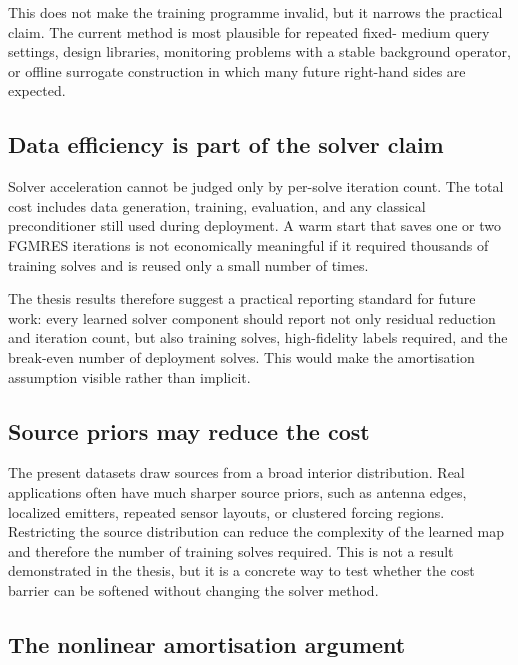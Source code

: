 This does not make the training programme invalid, but it narrows the
practical claim. The current method is most plausible for repeated fixed-
medium query settings, design libraries, monitoring problems with a stable
background operator, or offline surrogate construction in which many future
right-hand sides are expected.

\subsection{Data efficiency is part of the solver claim}
\label{subsec:discussion-data-efficiency}

Solver acceleration cannot be judged only by per-solve iteration count. The
total cost includes data generation, training, evaluation, and any classical
preconditioner still used during deployment. A warm start that saves one or
two FGMRES iterations is not economically meaningful if it required thousands
of training solves and is reused only a small number of times.

The thesis results therefore suggest a practical reporting standard for future
work: every learned solver component should report not only residual reduction
and iteration count, but also training solves, high-fidelity labels required,
and the break-even number of deployment solves. This would make the
amortisation assumption visible rather than implicit.

\subsection{Source priors may reduce the cost}
\label{subsec:discussion-source-priors}

The present datasets draw sources from a broad interior distribution. Real
applications often have much sharper source priors, such as antenna edges,
localized emitters, repeated sensor layouts, or clustered forcing regions.
Restricting the source distribution can reduce the complexity of the learned
map and therefore the number of training solves required. This is not a result
demonstrated in the thesis, but it is a concrete way to test whether the cost
barrier can be softened without changing the solver method.

\subsection{The nonlinear amortisation argument}
\label{subsec:discussion-nonlinear-amortisation}

